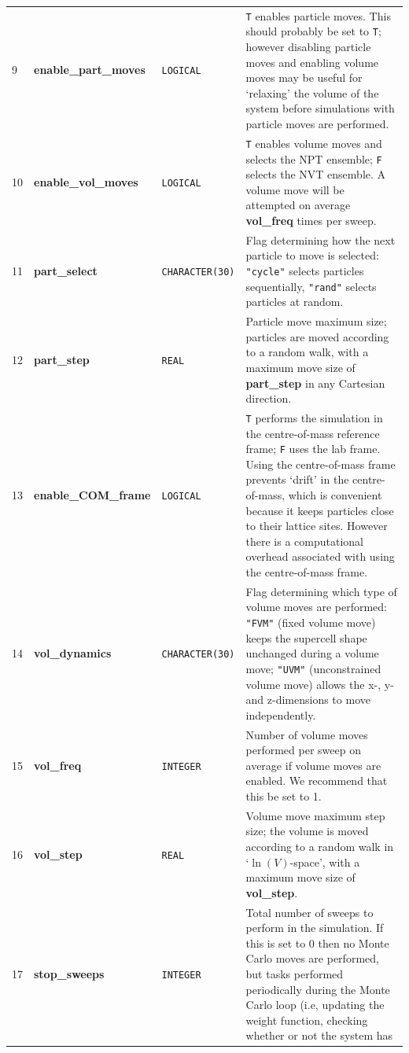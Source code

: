 \documentclass{report}
\begin{document}
\begin{landscape}
\begin{center}
\begin{longtable}{l l l p{8cm}}
9 & \textbf{enable\_part\_moves}  &  \texttt{LOGICAL}  & \texttt{T} enables particle moves. This should probably be set to \texttt{T}; however disabling 
particle moves and enabling volume moves may be useful for `relaxing' the volume of the system before simulations with particle moves are performed. \\
10 & \textbf{enable\_vol\_moves}  &  \texttt{LOGICAL}  & \texttt{T} enables volume moves and selects the NPT ensemble; \texttt{F} selects the NVT ensemble. 
A volume move will be attempted on average \textbf{vol\_freq} times per sweep. \\
11 & \textbf{part\_select}  &  \texttt{CHARACTER(30)}  & Flag determining how the next particle to move is selected: \texttt{"cycle"} selects particles 
sequentially, \texttt{"rand"} selects particles at random.  \\
12 & \textbf{part\_step}  &  \texttt{REAL}  & Particle move maximum size; particles are moved according to a random walk, with a maximum move size of 
\textbf{part\_step} in any Cartesian direction.  \\
13 & \textbf{enable\_COM\_frame}  &  \texttt{LOGICAL}  & \texttt{T} performs the simulation in the centre-of-mass reference frame; \texttt{F} uses 
the lab frame. Using the centre-of-mass frame prevents `drift' in the centre-of-mass, which is convenient because it keeps particles close to
their lattice sites. However there is a computational overhead associated with using the centre-of-mass frame. \\
14 & \textbf{vol\_dynamics}  &  \texttt{CHARACTER(30)}  & Flag determining which type of volume moves are performed: \texttt{"FVM"} (fixed volume move) 
keeps the supercell shape unchanged during a volume move; \texttt{"UVM"} (unconstrained volume move) allows the x-, y- and z-dimensions to move 
independently. \\
15 & \textbf{vol\_freq}  &  \texttt{INTEGER}  & Number of volume moves performed per sweep on average if volume moves are enabled.
We recommend that this be set to 1.\\
16 & \textbf{vol\_step}  &  \texttt{REAL}  & Volume move maximum step size; the volume is moved according to a random walk in `$\ln(V)$-space', with a 
maximum move size of \textbf{vol\_step}.  \\
17 & \textbf{stop\_sweeps}  &  \texttt{INTEGER}  & Total number of sweeps to perform in the simulation. If this is set to 0 then no Monte Carlo moves 
are performed, but tasks performed periodically during the Monte Carlo loop (i.e, updating the weight function, checking whether or not the system has 

\end{longtable}
\end{center}
\end{landscape}
\end{document}
